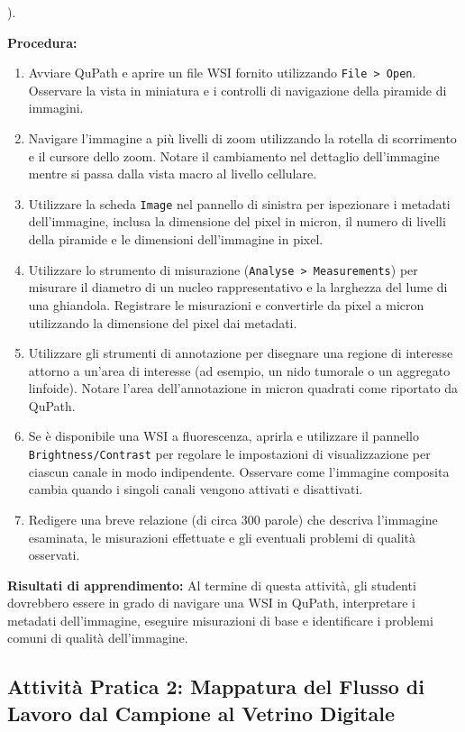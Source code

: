 ).

\textbf{Procedura:}
\begin{enumerate}
  \item Avviare QuPath e aprire un file WSI fornito utilizzando \texttt{File > Open}. Osservare la vista in miniatura e i controlli di navigazione della piramide di immagini.
  \item Navigare l'immagine a più livelli di zoom utilizzando la rotella di scorrimento e il cursore dello zoom. Notare il cambiamento nel dettaglio dell'immagine mentre si passa dalla vista macro al livello cellulare.
  \item Utilizzare la scheda \texttt{Image} nel pannello di sinistra per ispezionare i metadati dell'immagine, inclusa la dimensione del pixel in micron, il numero di livelli della piramide e le dimensioni dell'immagine in pixel.
  \item Utilizzare lo strumento di misurazione (\texttt{Analyse > Measurements}) per misurare il diametro di un nucleo rappresentativo e la larghezza del lume di una ghiandola. Registrare le misurazioni e convertirle da pixel a micron utilizzando la dimensione del pixel dai metadati.
  \item Utilizzare gli strumenti di annotazione per disegnare una regione di interesse attorno a un'area di interesse (ad esempio, un nido tumorale o un aggregato linfoide). Notare l'area dell'annotazione in micron quadrati come riportato da QuPath.
  \item Se è disponibile una WSI a fluorescenza, aprirla e utilizzare il pannello \texttt{Brightness/Contrast} per regolare le impostazioni di visualizzazione per ciascun canale in modo indipendente. Osservare come l'immagine composita cambia quando i singoli canali vengono attivati e disattivati.
  \item Redigere una breve relazione (di circa 300 parole) che descriva l'immagine esaminata, le misurazioni effettuate e gli eventuali problemi di qualità osservati.
\end{enumerate}

\textbf{Risultati di apprendimento:} Al termine di questa attività, gli studenti dovrebbero essere in grado di navigare una WSI in QuPath, interpretare i metadati dell'immagine, eseguire misurazioni di base e identificare i problemi comuni di qualità dell'immagine.

\subsection*{Attività Pratica 2: Mappatura del Flusso di Lavoro dal Campione al Vetrino Digitale}

